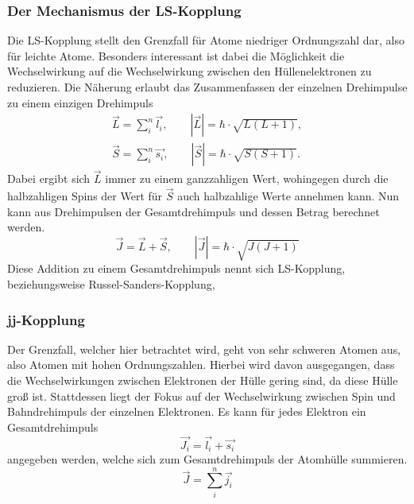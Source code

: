 \subsubsection{Der Mechanismus der LS-Kopplung}
Die LS-Kopplung stellt den Grenzfall für Atome niedriger Ordnungszahl dar, also für leichte Atome. Besonders interessant ist dabei die Möglichkeit die Wechselwirkung auf die Wechselwirkung zwischen den Hüllenelektronen zu reduzieren. Die Näherung erlaubt das Zusammenfassen der einzelnen Drehimpulse zu einem einzigen Drehimpuls
\begin{align}
    \vec{L}=\sum \limits_{i}^n \vec{l_i},\qquad |\vec{L}|=\hbar \cdot \sqrt{L(L+1)},\\
    \vec{S}=\sum \limits_{i}^n \vec{s_i},\qquad |\vec{S}|=\hbar \cdot \sqrt{S(S+1)}.
\end{align}
Dabei ergibt sich $\vec{L}$ immer zu einem ganzzahligen Wert, wohingegen durch die halbzahligen Spins der Wert für $\vec{S}$ auch halbzahlige Werte annehmen kann. Nun kann aus Drehimpulsen der Gesamtdrehimpuls und dessen Betrag 
berechnet werden.
\begin{equation}
    \vec{J}=\vec{L}+\vec{S},\qquad |\vec{J}|=\hbar\cdot\sqrt{J(J+1)}
\end{equation}
Diese Addition zu einem Gesamtdrehimpuls nennt sich LS-Kopplung, beziehungsweise Russel-Sanders-Kopplung,
\subsubsection{jj-Kopplung}
Der Grenzfall, welcher hier betrachtet wird, geht von sehr schweren Atomen aus, also Atomen mit hohen Ordnungszahlen. Hierbei wird davon ausgegangen, dass die Wechselwirkungen zwischen Elektronen der Hülle gering sind, da diese Hülle groß ist. Stattdessen liegt der Fokus auf der Wechselwirkung zwischen Spin und Bahndrehimpuls der einzelnen Elektronen. Es kann für jedes Elektron ein Gesamtdrehimpuls 
\begin{equation}
    \vec{J_i}=\vec{l_i}+\vec{s_i}
\end{equation}
angegeben werden, welche sich zum Gesamtdrehimpuls der Atomhülle summieren.
\begin{equation}
    \vec{J}=\sum \limits_i^n \vec{j_i}
\end{equation}
